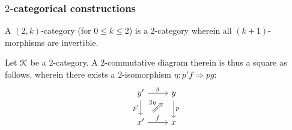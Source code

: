         \subsubsection{\texorpdfstring{$2$}{}-categorical constructions}
            \begin{definition} \label{def: 2_categories_and_2_functors}
                
            \end{definition}
            \begin{definition}[$(2, k)$-categories] \label{def: (2, k)_categories} 
                A $(2, k)$-category (for $0 \leq k \leq 2$) is a $2$-category wherein all $(k + 1)$-morphisms are invertible.
            \end{definition}
            \begin{definition} \label{def: 2_natural_transformations}
                
            \end{definition}
            \begin{definition} \label{def: natural_modifications}
                
            \end{definition}
            \begin{remark} \label{remark: 2_categories_of_2_functors}
                
            \end{remark}
            
            \begin{definition} \label{def: 2_commutative_diagrams}
                Let $\mathcal{K}$ be a $2$-category. A $2$-commutative diagram therein is thus a square as follows, wherein there exists a $2$-isomorphism $\eta: p'f \Rightarrow pg$:
                    $$
                        \begin{tikzcd}
                        	{y'} & y \\
                        	{x'} & x
                        	\arrow["{p'}"', from=1-1, to=2-1]
                        	\arrow["f", from=2-1, to=2-2]
                        	\arrow["g", from=1-1, to=1-2]
                        	\arrow["p", from=1-2, to=2-2]
                        	\arrow["\exists \eta", shorten <=8pt, shorten >=8pt, Rightarrow, from=2-1, to=1-2]
                        \end{tikzcd}
                    $$
            \end{definition}
            
